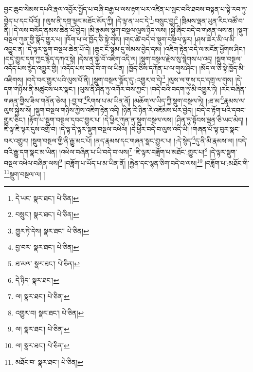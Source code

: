བྱང་ཆུབ་སེམས་དཔའི་རྣལ་འབྱོར་སྤྱོད་པ་བཞི་བརྒྱ་པ་ལས་རྟག་པར་འཛིན་པ་སྤང་བའི་ཐབས་བསྟན་པ་སྟེ་རབ་ཏུ་བྱེད་པ་དང་པོའོ།། །།ལུས་ནི་དགྲ་ལྟར་མཐོང་མོད་ཀྱི། །དེ་ལྟ་ན་ཡང་དེ་\footnote{དེ་ཡང་  སྣར་ཐང་།  པེ་ཅིན། }:བསྲུང་བྱ།\footnote{བསྲུང་།  སྣར་ཐང་།  པེ་ཅིན། } །ཁྲིམས་ལྡན་ཡུན་རིང་འཚོ་བ་ནི། །དེ་ལས་བསོད་ནམས་ཆེན་པོ་བྱེད། །མི་རྣམས་སྡུག་བསྔལ་ལུས་ཉིད་ལས། །སྐྱེ་ཞིང་བདེ་བ་གཞན་ལས་ན། །སྡུག་བསྔལ་ཀུན་གྱི་སྣོད་གྱུར་པ། །ཁོག་པ་ལ་ཁྱོད་ཅི་སྟེ་གུས། །གང་ཚེ་བདེ་བ་སྡུག་བསྔལ་ལྟར། །ཤས་ཆེར་མི་ལ་མི་འབྱུང་ན། །དེ་ལྟར་སྡུག་བསྔལ་ཆེན་པོ་དེ། །ཆུང་ངོ་སྙམ་དུ་སེམས་བྱེད་དམ། །འཇིག་རྟེན་བདེ་ལ་མངོན་ཕྱོགས་ཤིང་། །བདེ་གྱུར་དག་ཀྱང་རྙེད་དཀའ་སྟེ། །དེས་ན་སྐྱེ་བོ་འཇིག་འདི་ལ། །སྡུག་བསྔལ་རྗེས་སུ་སྙེགས་པ་འདྲ། །སྡུག་བསྔལ་འདོད་པས་རྙེད་འགྱུར་གྱི། །འདོད་པས་བདེ་བ་ག་ལ་ཡིན། །ཁྱོད་ཅིས་དཀོན་པ་ལ་གུས་ཤིང་། །མོད་ལ་ཅི་སྟེ་ཁྱོད་མི་འཇིགས། །བདེ་བར་གྱུར་པའི་ལུས་པོ་ནི། །སྡུག་བསྔལ་སྣོད་དུ་:འགྱུར་བ་དེ།\footnote{གྱུར་ཏེ་དེས།  སྣར་ཐང་།  པེ་ཅིན། } །ལུས་ལ་གུས་དང་དགྲ་ལ་གུས། །དེ་དག་གཉིས་ནི་མཚུངས་པར་སྣང་། །ལུས་ནི་ཤིན་ཏུ་འགོར་བས་ཀྱང་། །བདེ་བའི་བདག་ཏུ་མི་འགྱུར་ཏེ། །རང་བཞིན་གཞན་གྱིས་ཟིལ་གནོན་ཅེས། །:བྱ་བ་\footnote{བྱ་བར་  སྣར་ཐང་།  པེ་ཅིན། }རིགས་པ་མ་ཡིན་ནོ། །མཆོག་ལ་ཡིད་ཀྱི་སྡུག་བསྔལ་ཏེ། །:ཐ་མ་\footnote{ཐ་མལ་  སྣར་ཐང་།  པེ་ཅིན། }རྣམས་ལ་ལུས་སྐྱེས་སོ། །སྡུག་བསྔལ་གཉིས་ཀྱིས་འཇིག་རྟེན་འདི། །ཉིན་རེ་ཉིན་རེ་འཇོམས་པར་བྱེད། །བདེ་བ་རྟོག་པའི་དབང་གྱུར་ཅིང་། །རྟོག་པ་སྡུག་བསྔལ་དབང་གྱུར་པ། །དེ་ཕྱིར་ཀུན་ན་སྡུག་བསྔལ་ལས། །ཤིན་ཏུ་སྟོབས་ལྡན་ཅི་ཡང་མེད། །ཇི་ལྟ་ཇི་ལྟར་དུས་འགྲོ་བ། །དེ་ལྟ་དེ་ལྟར་སྡུག་བསྔལ་འཕེལ། །དེ་ཕྱིར་བདེ་བ་ལུས་འདི་ཡི། །གཞན་པོ་ལྟ་བུར་སྣང་བར་འགྱུར། །སྡུག་བསྔལ་གྱི་ནི་རྒྱུ་མང་པོ། །ནད་རྣམས་དང་གཞན་སྣང་གྱུར་པ། །:དེ་སྙེད་\footnote{དེ་ཉིད་  སྣར་ཐང་། }དུ་ནི་མི་རྣམས་ལ། །བདེ་བའི་རྒྱུ་དག་སྣང་མ་ཡིན། །འཕེལ་བཞིན་པ་ཡི་བདེ་བ་ལས།\footnote{ལ།  སྣར་ཐང་།  པེ་ཅིན། } །ཇི་ལྟར་བཟློག་པ་མཐོང་:གྱུར་པ།\footnote{འགྱུར་བ།  སྣར་ཐང་།  པེ་ཅིན། } །དེ་ལྟར་སྡུག་བསྔལ་འཕེལ་བཞིན་ལས།\footnote{ལ།  སྣར་ཐང་།  པེ་ཅིན། } །བཟློག་པ་ཡོད་པ་མ་ཡིན་ནོ། །རྐྱེན་དང་ལྷན་ཅིག་བདེ་བ་ལས།\footnote{ལ།  སྣར་ཐང་།  པེ་ཅིན། } །བཟློག་པ་:མཐོང་གི་\footnote{མཐོང་བ་  སྣར་ཐང་།  པེ་ཅིན། }སྡུག་བསྔལ་ལ། །
